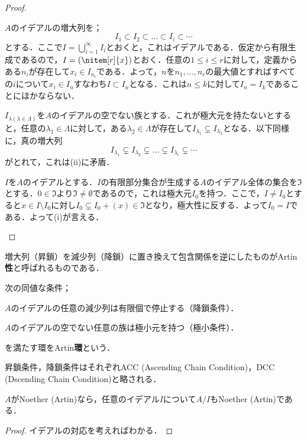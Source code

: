\begin{proof}
	\begin{eqv}[3]
		\item 
		$A$のイデアルの増大列を；
		\[I_1\subset I_2\subset\dots\subset I_i\subset\cdots\]
		とする．ここで$I=\bigcup_{i=1}^\infty I_i$とおくと，これはイデアルである．仮定から有限生成であるので，$I=(\nitem[r]{x})$とおく．任意の$1\leq i\leq r$に対して，定義からある$n_i$が存在して$x_i\in I_{n_i}$である．よって，$n$を$n_1,\dots,n_r$の最大値とすればすべての$i$について$x_i\in I_n$すなわち$I\subset I_{n}$となる．これは$n\leq k$に対して$I_{n}=I_k$であることにほかならない．
		\item
		$I_{\lambda(\lambda\in\Lambda)}$を$A$のイデアルの空でない族とする．これが極大元を持たないとすると，任意の$\lambda_1\in\Lambda$に対して，ある$\lambda_2\in\Lambda$が存在して$I_{\lambda_1}\subsetneq I_{\lambda_2}$となる．以下同様に，真の増大列
		\[I_{\lambda_1}\subsetneq I_{\lambda_2}\subsetneq\dots\subsetneq I_{\lambda_i}\subsetneq\cdots\]
		がとれて，これは(ii)に矛盾．
		\item 
		$I$を$A$のイデアルとする．$I$の有限部分集合が生成する$A$のイデアル全体の集合を$\Im$とする．$0\in\Im$より$\Im\neq\emptyset$であるので，これは極大元$I_0$を持つ．ここで，$I\neq I_0$とすると$x\in I\setminus I_0$に対し$I_0\subsetneq I_0+(x)\in\Im$となり，極大性に反する．よって$I_0=I$である．よって(i)が言える．
	\end{eqv}
\end{proof}

増大列（昇鎖）を減少列（降鎖）に置き換えて包含関係を逆にしたものがArtin\textbf{性}と呼ばれるものである．

\begin{defi}[Artin環]
	次の同値な条件；
	\begin{sakura}
		\item  $A$のイデアルの任意の減少列は有限個で停止する（降鎖条件）．
		\item $A$のイデアルの空でない任意の族は極小元を持つ（極小条件）．
	\end{sakura}
	を満たす環をArtin\textbf{環}という．
\end{defi}

昇鎖条件，降鎖条件はそれぞれACC (Ascending Chain Condition)，DCC (Dscending Chain Condition)と略される．

\begin{prop}
	$A$がNoether (Artin)なら，任意のイデアル$I$について$A/I$もNoether (Artin)である．
\end{prop}
\begin{proof}
	イデアルの対応を考えればわかる．
\end{proof}

